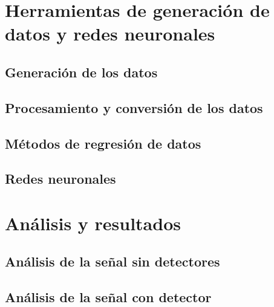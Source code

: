 \documentclass[12pt]{report}
\begin{document}
\chapter{Herramientas de generación de datos y redes neuronales}


	\section{Generación de los datos}\label{Cap_genera}
    

    \section{Procesamiento y conversión de los datos}
    
    
    \section{Métodos de regresión de datos}\label{Cap_regresion}
    
    
    \section{Redes neuronales}
    

    
	
        

\chapter{Análisis y resultados}


	\section{Análisis de la señal sin detectores}
	
	
	\section{Análisis de la señal con detector}
    
    
\end{document}
